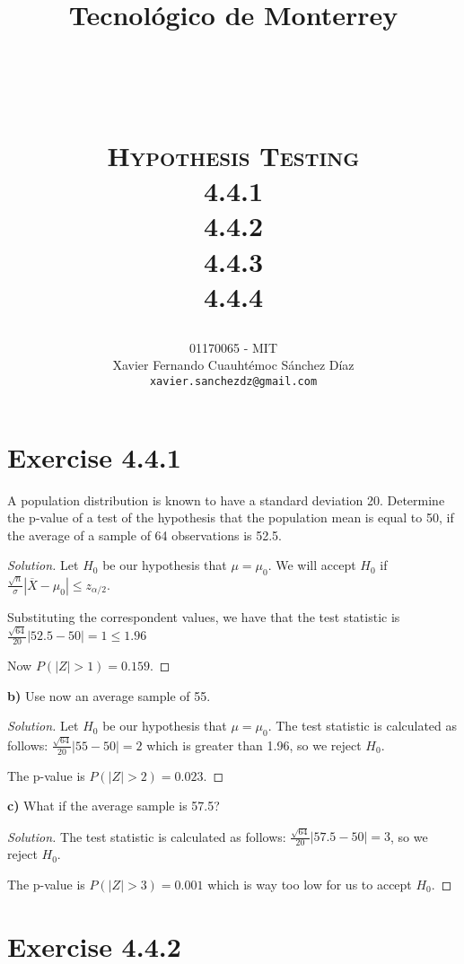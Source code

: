 \documentclass[titlepage, letterpaper, fleqn]{article}
\title{
\vspace{1in}
\textbf{Tecnológico de Monterrey} \\
\vspace{0.5in}
\textmd{\mahclass} \\
\large{\textit{\mahteacher}} \\
\vspace{0.5in}
\textsc{\mahtitle}\\
\textsc{Hypothesis Testing}\\
\textsc{4.4.1}\\
\textsc{4.4.2}\\
\textsc{4.4.3}\\
\textsc{4.4.4}\\
\author{01170065  - MIT \\
Xavier Fernando Cuauhtémoc Sánchez Díaz \\
\texttt{xavier.sanchezdz@gmail.com}}
\date{\mahdate}
}
\newcommand{\spacepls}{\vspace{5mm}}
\renewcommand\qedsymbol{\(\blacksquare\)}
\newenvironment{solution}
{\renewcommand\qedsymbol{$\square$}\begin{proof}[Solution]}
{\end{proof}}
\begin{document}
\begin{titlepage}
\maketitle
\end{titlepage}

%
%

\section{Exercise 4.4.1}

{\large A population distribution is known to have a standard deviation 20.
Determine the p-value of a test of the hypothesis that the population mean is equal to 50, if the average of a sample of 64 observations is 52.5.}

\begin{solution}
Let $H_0$ be our hypothesis that $\mu = \mu_0$.
We will accept $H_0$ if $\frac{\sqrt{n}}{\sigma}|\overline{X}-\mu_0| \leq z_{\alpha/2}$.

Substituting the correspondent values, we have that the test statistic is $\frac{\sqrt{64}}{20}|52.5-50| = 1 \leq 1.96$

Now $P(|Z| > 1) = 0.159$.
\end{solution}

\spacepls

{\large \textbf{b)} Use now an average sample of 55.}

\begin{solution}
Let $H_0$ be our hypothesis that $\mu = \mu_0$.
The test statistic is calculated as follows: $\frac{\sqrt{64}}{20}|55-50| = 2$ which is greater than 1.96, so we reject $H_0$.

The p-value is $P(|Z| > 2) = 0.023$.
\end{solution}

\spacepls

{\large \textbf{c)} What if the average sample is 57.5?}

\begin{solution}
The test statistic is calculated as follows: $\frac{\sqrt{64}}{20}|57.5-50| = 3$, so we reject $H_0$.

The p-value is $P(|Z| > 3) = 0.001$ which is way too low for us to accept $H_0$.
\end{solution}

\spacepls

\section{Exercise 4.4.2}
\end{document}
